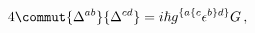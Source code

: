 \begin{equation}
\label{eq:Delta-comm}
  4\commut{\Delta^{ab}}{\Delta^{cd}}
=
i\hbar g^{\{a\{c } \epsilon^{b\}d\}} G\,, 
\end{equation}


